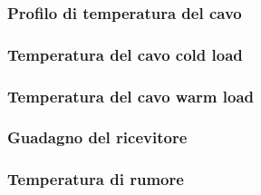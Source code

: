 \subsubsection{Profilo di temperatura del cavo}
\subsubsection{Temperatura del cavo cold load}
\subsubsection{Temperatura del cavo warm load}
\subsubsection{Guadagno del ricevitore}
\subsubsection{Temperatura di rumore}